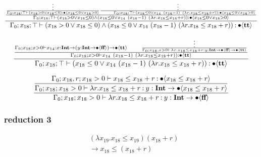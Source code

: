 \documentclass{article}
\begin{document}
\begin{align*}
\frac{
\frac{
    \frac{\vdots}{
    \Gamma_0; x_{18}; \top \vdash (x_{18} > 0 \vee x_{18}\leq 0)
    \mathbin{:} \bullet \langle x_{18} \leq 0 \vee x_{18} > 0 \rangle
}
    \frac{\vdots}{
        \qquad \Gamma_0; x_{18}; \top \vdash (x_{18} \leq 0 \vee
    x_{14}\ (x_{18} - 1)\  (\lambda r. x_{18} \leq x_{18} + r)) \mathbin{:}
    \bullet \langle x_{18} \leq 0 \vee x_{18} > 0 \rangle
}
}{
    \Gamma_0; x_{18}; \top \vdash (x_{18} > 0 \vee x_{18}\leq 0)
\wedge (x_{18} \leq 0 \vee
    x_{14}\ (x_{18} - 1)\  (\lambda r. x_{18} \leq x_{18} + r)) \mathbin{:}
    \bullet \langle x_{18} \leq 0 \vee x_{18} > 0 \rangle
}
}{
        \Gamma_0; x_{18}; \top \vdash (x_{18} > 0 \vee x_{18}\leq 0)
\wedge (x_{18} \leq 0 \vee
    x_{14}\ (x_{18} - 1)\  (\lambda r. x_{18} \leq x_{18} + r)) \mathbin{:}
    \bullet \langle \textbf{tt} \rangle
}
\end{align*}

\begin{align*}
\frac{
 \frac{
 \Gamma_0; x_{18}; x > 0 \vdash
    x_{14} \mathbin{:} {x} : \textbf{Int} \to ({y} : \textbf{Int} \to \bullet \langle \textbf{ff} \rangle) \to \bullet \langle \textbf{tt} \rangle
    \qquad
    \frac{\vdots}{
 \Gamma_0; x_{18}; x > 0 \vdash
    \lambda r. x_{18} \leq x_{18} + r \mathbin{:} {y} : \textbf{Int} \to \bullet \langle \textbf{ff} \rangle \to \bullet \langle \textbf{tt} \rangle
}
 }{
 \Gamma_0; x_{18}; x > 0 \vdash
    x_{14}\ (x_{18} - 1)\  (\lambda r. x_{18} \leq x_{18} + r)) \mathbin{:}
    \bullet \langle \textbf{tt} \rangle
 }
}{
 \Gamma_0; x_{18}; \top \vdash (x_{18} \leq 0 \vee
    x_{14}\ (x_{18} - 1)\  (\lambda r. x_{18} \leq x_{18} + r)) \mathbin{:}
    \bullet \langle \textbf{tt} \rangle
}
\end{align*}

\begin{align*}
\dfrac{
\dfrac{
        \Gamma_0; x_{18}, r; x_{18} > 0 \vdash
    x_{18} \leq x_{18} + r \mathbin{:} \bullet \langle x_{18} \leq x_{18} + r \rangle
}{
        \Gamma_0; x_{18}; x_{18} > 0 \vdash
    \lambda r. x_{18} \leq x_{18} + r \mathbin{:} {y} : \textbf{Int} \to \bullet \langle x_{18} \leq x_{18} + r \rangle
}}
    {
        \Gamma_0; x_{18}; x_{18} > 0 \vdash
    \lambda r. x_{18} \leq x_{18} + r \mathbin{:} {y} : \textbf{Int} \to \bullet \langle \textbf{ff} \rangle
    }
\end{align*}

\subsubsection{reduction 3}

\begin{align*}
    &(\lambda x_{19}. x_{18} \leq x_{19}) (x_{18} + r)\\
    &\longrightarrow
    x_{18} \leq (x_{18} + r)
\end{align*}
\end{document}
